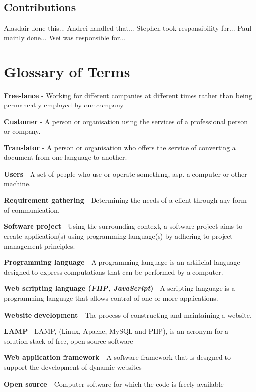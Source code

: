 \documentclass{l3proj}
\begin{document}
\section{Contributions}
\label{sec:contrib}

Alasdair done this...
Andrei handled that...
Stephen took responsibility for... 
Paul mainly done...
Wei was responsible for...	





\appendix
\chapter{Glossary of Terms}
\label{chap:gloss}

\begin{itemize}
\small{
\item{\textbf{Free-lance} - Working for different companies at different times rather than being permanently employed by one company.} 
\item{\textbf{Customer} - A person or organisation using the services of a professional person or company.}
\item{\textbf{Translator} - A person or organisation who offers the service of converting a document from one language to another.}
\item{\textbf{Users} - A set of people who use or operate something, asp. a computer or other machine.}
\item{\textbf{Requirement gathering} - Determining the needs of a client through any form of communication.}
\item{\textbf{Software project} - Using the surrounding context, a software project aims to create application(s) using programming language(s) by adhering
to project management principles.}
\item{\textbf{Programming language} - A programming language is an artificial
language designed to express computations that can be performed by a computer.} \item{\textbf{Web scripting language (\textit{PHP, JavaScript})} - A scripting language is a programming language that allows control of one or more
applications.}
\item{\textbf{Website development} - The process of constructing and maintaining a website.}
\item{\textbf{LAMP} - LAMP, (Linux, Apache, MySQL and PHP), is an acronym for a solution stack of free, open source software}
\item{\textbf{Web application framework} - A software framework that is designed to support the development of dynamic websites }
\item{\textbf{Open source} - Computer software for which the code is freely available }
}
\end{itemize}
\end{document}
